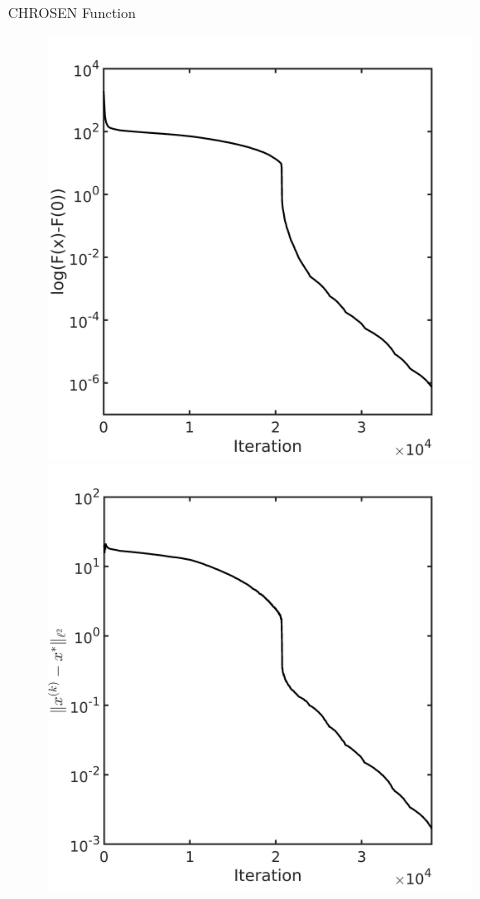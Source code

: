 \documentclass{beamer}
\begin{document}
\begin{frame}{CHROSEN Function}
\begin{figure}[!htbp]
	  \includegraphics[scale=0.18]{./figures/chrosen100D.png}
	  \includegraphics[scale=0.18]{./figures/chrosen100D_dist.png}
\end{figure}
\end{frame}
\end{document}
